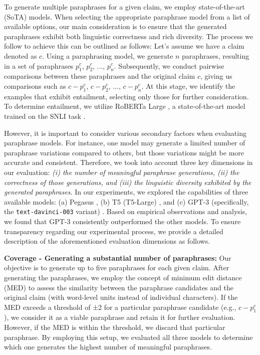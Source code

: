  To generate multiple paraphrases for a given claim, we employ state-of-the-art (SoTA) models. When selecting the appropriate paraphrase model from a list of available options, our main consideration is to ensure that the generated paraphrases exhibit both linguistic correctness and rich diversity. The process we follow to achieve this can be outlined as follows: Let's assume we have a claim denoted as $c$. Using a paraphrasing model, we generate $n$ paraphrases, resulting in a set of paraphrases $p_1^c$, $p_2^c$, ..., $p_n^c$. Subsequently, we conduct pairwise comparisons between these paraphrases and the original claim $c$, giving us comparisons such as $c-p_1^c$, $c-p_2^c$, ..., $c-p_n^c$. At this stage, we identify the examples that exhibit entailment, selecting only those for further consideration. To determine entailment, we utilize RoBERTa Large \cite{liu2019roberta}, a state-of-the-art model trained on the SNLI task \cite{bowman2015large}.



However, it is important to consider various secondary factors when evaluating paraphrase models. For instance, one model may generate a limited number of paraphrase variations compared to others, but those variations might be more accurate and consistent. Therefore, we took into account three key dimensions in our evaluation: \textit{(i) the number of meaningful paraphrase generations, (ii) the correctness of those generations, and (iii) the linguistic diversity exhibited by the generated paraphrases}. In our experiments, we explored the capabilities of three available models: (a) Pegasus \cite{zhang2020pegasus}, (b) T5 (T5-Large) \cite{raffel2020exploring}, and (c) GPT-3 (specifically, the \texttt{text-davinci-003} variant) \cite{brown2020language}. Based on empirical observations and analysis, we found that GPT-3 consistently outperformed the other models. To ensure transparency regarding our experimental process, we provide a detailed description of the aforementioned evaluation dimensions as follows.



\textbf{Coverage - Generating a substantial number of paraphrases:} Our objective is to generate up to five paraphrases for each given claim. After generating the paraphrases, we employ the concept of minimum edit distance (MED) \cite{wagner1974string} to assess the similarity between the paraphrase candidates and the original claim (with word-level units instead of individual characters). If the MED exceeds a threshold of ±2 for a particular paraphrase candidate (e.g., $c-p_1^c$), we consider it as a viable paraphrase and retain it for further evaluation. However, if the MED is within the threshold, we discard that particular paraphrase. By employing this setup, we evaluated all three models to determine which one generates the highest number of meaningful paraphrases.

